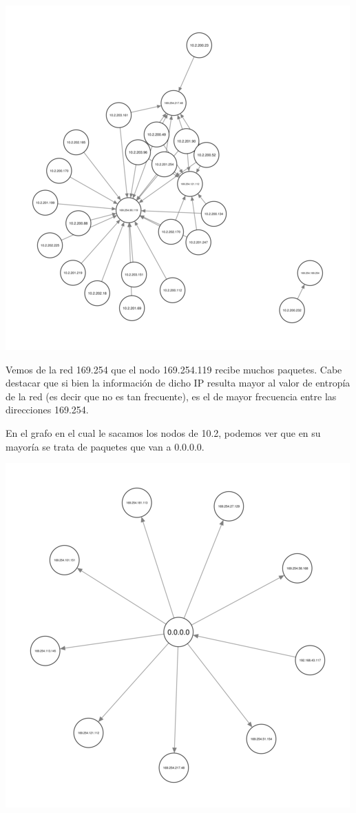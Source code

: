 \includegraphics[scale=0.6]{../img/exactas-redesAB.png} 

Vemos de la red 169.254 que el nodo 169.254.119 recibe muchos
paquetes. Cabe destacar que si bien la información de dicho IP resulta
mayor al valor de entropía de la red (es decir que no es tan
frecuente), es el de mayor frecuencia entre las direcciones 169.254.

En el grafo en el cual le sacamos los nodos de 10.2, podemos ver que
en su mayoría se trata de paquetes que van a 0.0.0.0.

\includegraphics[scale=0.5]{../img/exactas-sin10-2.png}

